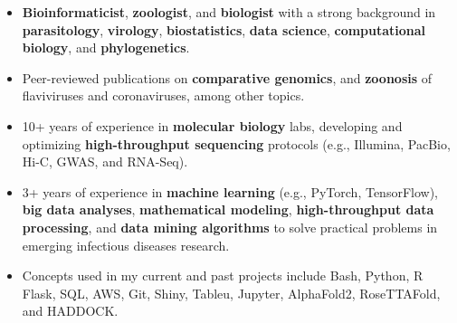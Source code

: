 \documentclass[11pt, letterpaper, sans]{moderncv}
\begin{document}
    \thispagestyle{empty}
    \maketitle


\vspace{-4.5em}

\begin{itemize}[itemsep=0in, labelindent=0in, leftmargin=*]


\item \textbf{Bioinformaticist}, \textbf{zoologist}, and \textbf{biologist} with a strong background in \textbf{parasitology}, \textbf{virology}, \textbf{biostatistics}, \textbf{data science}, \textbf{computational biology}, and \textbf{phylogenetics}.

\item Peer-reviewed publications on \textbf{comparative genomics}, and \textbf{zoonosis} of flaviviruses and coronaviruses, among other topics.

\item 10+ years of experience in \textbf{molecular biology} labs, developing and optimizing \textbf{high-throughput sequencing} protocols (e.g., Illumina, PacBio, Hi-C, GWAS, and RNA-Seq).

\item 3+ years of experience in \textbf{machine learning} (e.g., PyTorch, TensorFlow), \textbf{big data analyses}, \textbf{mathematical modeling}, \textbf{high-throughput data processing}, and \textbf{data mining algorithms} to solve practical problems in emerging infectious diseases research.

\item Concepts used in my current and past projects include Bash, Python, R Flask, SQL, AWS, Git, Shiny, Tableu, Jupyter, AlphaFold2, RoseTTAFold, and HADDOCK.

\end{itemize}
\end{document}
